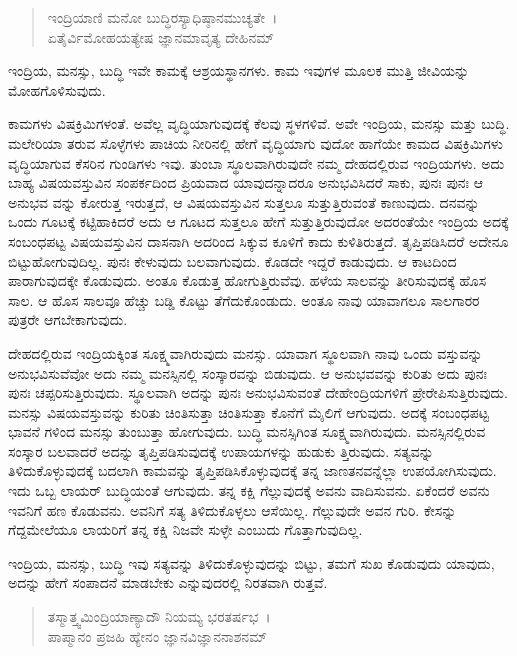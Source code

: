 \begin{verse}
ಇಂದ್ರಿಯಾಣಿ ಮನೋ ಬುದ್ಧಿರಸ್ಯಾಧಿಷ್ಠಾನಮುಚ್ಯತೇ~।\\ಏತೈರ್ವಿಮೋಹಯತ್ಯೇಷ ಜ್ಞಾನಮಾವೃತ್ಯ ದೇಹಿನಮ್ 
\end{verse}

{\small ಇಂದ್ರಿಯ, ಮನಸ್ಸು, ಬುದ್ಧಿ ಇವೇ ಕಾಮಕ್ಕೆ ಆಶ್ರಯಸ್ಥಾನಗಳು. ಕಾಮ ಇವುಗಳ ಮೂಲಕ ಮುತ್ತಿ ಜೀವಿಯನ್ನು ಮೋಹಗೊಳಿಸುವುದು.}

ಕಾಮಗಳು ವಿಷಕ್ರಿಮಿಗಳಂತೆ. ಅವೆಲ್ಲ ವೃದ್ಧಿಯಾಗುವುದಕ್ಕೆ ಕೆಲವು ಸ್ಥಳಗಳಿವೆ. ಅವೇ ಇಂದ್ರಿಯ, ಮನಸ್ಸು ಮತ್ತು ಬುದ್ಧಿ. ಮಲೇರಿಯಾ ತರುವ ಸೊಳ್ಳೆಗಳು ಪಾಚಿಯ ನೀರಿನಲ್ಲಿ ಹೇಗೆ ವೃದ್ಧಿಯಾಗು ವುದೋ ಹಾಗೆಯೇ ಕಾಮದ ವಿಷಕ್ರಿಮಿಗಳು ವೃದ್ಧಿಯಾಗುವ ಕೆಸರಿನ ಗುಂಡಿಗಳು ಇವು. ತುಂಬಾ ಸ್ಥೂಲವಾಗಿರುವುದೇ ನಮ್ಮ ದೇಹದಲ್ಲಿರುವ ಇಂದ್ರಿಯಗಳು. ಅದು ಬಾಹ್ಯ ವಿಷಯವಸ್ತುವಿನ ಸಂಪರ್ಕದಿಂದ ಪ್ರಿಯವಾದ ಯಾವುದನ್ನಾದರೂ ಅನುಭವಿಸಿದರೆ ಸಾಕು, ಪುನಃ ಪುನಃ ಆ ಅನುಭವ ವನ್ನು ಕೋರುತ್ತ ಇರುತ್ತದೆ, ಆ ವಿಷಯವಸ್ತುವಿನ ಸುತ್ತಲೂ ಸುತ್ತುತ್ತಿರುವಂತೆ ಕಾಣುವುದು. ದನವನ್ನು ಒಂದು ಗೂಟಕ್ಕೆ ಕಟ್ಟಿಹಾಕಿದರೆ ಅದು ಆ ಗೂಟದ ಸುತ್ತಲೂ ಹೇಗೆ ಸುತ್ತುತ್ತಿರುವುದೋ ಅದರಂತೆಯೇ ಇಂದ್ರಿಯ ಅದಕ್ಕೆ ಸಂಬಂಧಪಟ್ಟ ವಿಷಯವಸ್ತುವಿನ ದಾಸನಾಗಿ ಅದರಿಂದ ಸಿಕ್ಕುವ ಕೂಳಿಗೆ ಕಾದು ಕುಳಿತಿರುತ್ತದೆ. ತೃಪ್ತಿಪಡಿಸಿದರೆ ಅದೇನೂ ಬಿಟ್ಟುಹೋಗುವುದಿಲ್ಲ. ಪುನಃ ಕೇಳುವುದು ಬಲವಾಗುವುದು. ಕೊಡದೇ ಇದ್ದರೆ ಕಾಡುವುದು. ಆ ಕಾಟದಿಂದ ಪಾರಾಗುವುದಕ್ಕೇ ಕೊಡುವುದು. ಅಂತೂ ಕೊಡುತ್ತ ಹೋಗುತ್ತಿರುವೆವು. ಹಳೆಯ ಸಾಲವನ್ನು ತೀರಿಸುವುದಕ್ಕೆ ಹೊಸ ಸಾಲ. ಆ ಹೊಸ ಸಾಲವೂ ಹೆಚ್ಚು ಬಡ್ಡಿ ಕೊಟ್ಟು ತೆಗೆದುಕೊಂಡುದು. ಅಂತೂ ನಾವು ಯಾವಾಗಲೂ ಸಾಲಗಾರರ ಪುತ್ರರೇ ಆಗಬೇಕಾಗುವುದು.

ದೇಹದಲ್ಲಿರುವ ಇಂದ್ರಿಯಕ್ಕಿಂತ ಸೂಕ್ಷ್ಮವಾಗಿರುವುದು ಮನಸ್ಸು. ಯಾವಾಗ ಸ್ಥೂಲವಾಗಿ ನಾವು ಒಂದು ವಸ್ತುವನ್ನು ಅನುಭವಿಸುವೆವೋ ಅದು ನಮ್ಮ ಮನಸ್ಸಿನಲ್ಲಿ ಸಂಸ್ಕಾರವನ್ನು ಬಿಡುವುದು. ಆ ಅನುಭವವನ್ನು ಕುರಿತು ಅದು ಪುನಃ ಪುನಃ ಚಪ್ಪರಿಸುತ್ತಿರುವುದು. ಸ್ಥೂಲವಾಗಿ ಅದನ್ನು ಪುನಃ ಅನುಭವಿಸುವಂತೆ ದೇಹೇಂದ್ರಿಯಗಳಿಗೆ ಪ್ರೇರೇಪಿಸುತ್ತಿರುವುದು. ಮನಸ್ಸು ವಿಷಯವಸ್ತುವನ್ನು ಕುರಿತು ಚಿಂತಿಸುತ್ತಾ ಚಿಂತಿಸುತ್ತಾ ಕೊನೆಗೆ ಮೈಲಿಗೆ ಆಗುವುದು. ಅದಕ್ಕೆ ಸಂಬಂಧಪಟ್ಟ ಭಾವನೆ ಗಳಿಂದ ಮನಸ್ಸು ತುಂಬುತ್ತಾ ಹೋಗುವುದು. ಬುದ್ಧಿ ಮನಸ್ಸಿಗಿಂತ ಸೂಕ್ಷ್ಮವಾಗಿರುವುದು. ಮನಸ್ಸಿನಲ್ಲಿರುವ ಸಂಸ್ಕಾರ ಬಲವಾದರೆ ಅದನ್ನು ತೃಪ್ತಿಪಡಿಸುವುದಕ್ಕೆ ಉಪಾಯಗಳನ್ನು ಹುಡುಕು ತ್ತಿರುವುದು. ಸತ್ಯವನ್ನು ತಿಳಿದುಕೊಳ್ಳುವುದಕ್ಕೆ ಬದಲಾಗಿ ಕಾಮವನ್ನು ತೃಪ್ತಿಪಡಿಸಿಕೊಳ್ಳುವುದಕ್ಕೆ ತನ್ನ ಜಾಣತನವನ್ನೆಲ್ಲಾ ಉಪಯೋಗಿಸುವುದು. ಇದು ಒಬ್ಬ ಲಾಯರ್ ಬುದ್ಧಿಯಂತೆ ಆಗುವುದು. ತನ್ನ ಕಕ್ಷಿ ಗೆಲ್ಲುವುದಕ್ಕೆ ಅವನು ವಾದಿಸುವನು. ಏಕೆಂದರೆ ಅವನು ಇವನಿಗೆ ಹಣ ಕೊಡುವನು. ಅವನಿಗೆ ಸತ್ಯ ತಿಳಿದುಕೊಳ್ಳಲು ಆಸೆಯಿಲ್ಲ. ಗೆಲ್ಲುವುದೇ ಅವನ ಗುರಿ. ಕೇಸನ್ನು ಗೆದ್ದಮೇಲೆಯೂ ಲಾಯರಿಗೆ ತನ್ನ ಕಕ್ಷಿ ನಿಜವೇ ಸುಳ್ಳೇ ಎಂಬುದು ಗೊತ್ತಾಗುವುದಿಲ್ಲ.

ಇಂದ್ರಿಯ, ಮನಸ್ಸು, ಬುದ್ಧಿ ಇವು ಸತ್ಯವನ್ನು ತಿಳಿದುಕೊಳ್ಳುವುದನ್ನು ಬಿಟ್ಟು, ತಮಗೆ ಸುಖ ಕೊಡುವುದು ಯಾವುದು, ಅದನ್ನು ಹೇಗೆ ಸಂಪಾದನೆ ಮಾಡಬೇಕು ಎನ್ನುವುದರಲ್ಲಿ ನಿರತವಾಗಿ ರುತ್ತವೆ.

\begin{verse}
ತಸ್ಮಾತ್ತ್ವಮಿಂದ್ರಿಯಾಣ್ಯಾದೌ ನಿಯಮ್ಯ ಭರತರ್ಷಭ~।\\ಪಾಪ್ಮಾನಂ ಪ್ರಜಹಿ ಹ್ಯೇನಂ ಜ್ಞಾನವಿಜ್ಞಾನನಾಶನಮ್ 
\end{verse}

